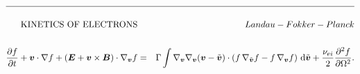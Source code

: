 \documentclass[8pt, compress]{beamer}
\newcommand{\pdv}[2]{\frac{\partial{#1}}{\partial{#2}}}
\newcommand{\vect}[1]{\boldsymbol{#1}}
\newcommand{\dI}{\text{d}}
\newcommand{\nuei}{\nu_{ei}}
\newcommand{\vv}{\vect{v}}
\newcommand{\vvb}{\tilde{\vect{v}}}
\newcommand{\gv}{\nabla_{\vv}}
\newcommand{\gvb}{\nabla_{\vvb}}
\newcommand{\ft}{f}
\begin{document}
\begin{frame}
\begin{center}
\begin{eqnarray}
  \nonumber \\
  && \nonumber \\
  \hline \nonumber \\
  \text{KINETICS OF ELECTRONS} && Landau-Fokker-Planck \nonumber \\
  && \nonumber \\
  \pdv{f}{t} + \vect{v}\cdot\nabla f +
  \left( \vect{E} + \vect{v}\times\vect{B}\right)\cdot\nabla_{\vect{v}} f
  &=& 
  \Gamma\int \gv\gv(\vv - \vvb) \cdot \left(
  \ft\, \gvb \ft - \ft\, \gv \ft \right)\, \dI\vvb
  + \frac{\nuei}{2} \frac{\partial^2 f}{\partial \Omega^2} .
  \nonumber
\end{eqnarray}
\end{center}
\end{frame}
\end{document}
